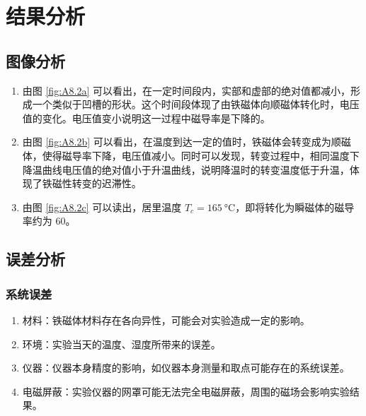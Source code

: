 \section{结果分析}
\subsection{图像分析}
\begin{enumerate}
    \item 由图 \ref{fig:A8.2a} 可以看出，在一定时间段内，实部和虚部的绝对值都减小，形成一个类似于凹槽的形状。这个时间段体现了由铁磁体向顺磁体转化时，电压值的变化。电压值变小说明这一过程中磁导率是下降的。
    \item 由图 \ref{fig:A8.2b} 可以看出，在温度到达一定的值时，铁磁体会转变成为顺磁体，使得磁导率下降，电压值减小。同时可以发现，转变过程中，相同温度下降温曲线电压值的绝对值小于升温曲线，说明降温时的转变温度低于升温，体现了铁磁性转变的迟滞性。
    \item 由图 \ref{fig:A8.2c} 可以读出，居里温度 $T_c=\SI{165}{\degreeCelsius}$，即将转化为瞬磁体的磁导率约为 60。
\end{enumerate}
\subsection{误差分析}
\subsubsection{系统误差}
\begin{enumerate}
    \item 材料：铁磁体材料存在各向异性，可能会对实验造成一定的影响。
    \item 环境：实验当天的温度、湿度所带来的误差。
    \item 仪器：仪器本身精度的影响，如仪器本身测量和取点可能存在的系统误差。
    \item 电磁屏蔽：实验仪器的网罩可能无法完全电磁屏蔽，周围的磁场会影响实验结果。
\end{enumerate}

